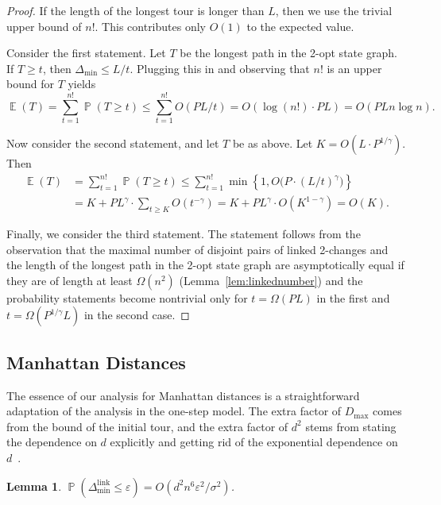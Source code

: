 \documentclass[11pt,DIV=12,a4paper]{scrartcl}
\newtheorem{lemma}[claim]{Lemma}
\newcommand{\eps}{\varepsilon}
\newcommand{\maxx}{D_{\max}}
\newcommand{\dmin}{\Delta_{\min}}
\newcommand{\dminl}{\Delta_{\min}^{\operatorname{link}}}
\DeclareMathOperator{\probab}{\mathbb{P}}
\DeclareMathOperator{\expected}{\mathbb{E}}
\begin{document}
\begin{proof}
If the length of the longest tour is longer than $L$, then we use the trivial
upper bound of $n!$. This contributes only $O(1)$ to the expected value.

Consider the first statement.
Let $T$ be the longest path in the 2-opt state graph. If $T \geq t$,
then $\dmin \leq L/t$.
Plugging this in and observing that $n!$ is an upper bound for $T$ yields
\[
  \expected(T)  = \sum_{t=1}^{n!} \probab(T\geq t) 
 \leq \sum_{t=1}^{n!} O(PL/t) = O(\log(n!) \cdot PL) = O(PLn \log n).
\]

Now consider the second statement, and let $T$ be as above.
Let $K = O(L \cdot P^{1/\gamma})$.
Then
\begin{align*}
  \expected(T) & = \sum_{t=1}^{n!} \probab(T \geq t) 
  \leq \sum_{t=1}^{n!} \min\left\{1, O\bigl(P \cdot (L/t)^\gamma\bigr)\right\} \\
& = K + PL^{\gamma} \cdot \sum_{t \geq K} O(t^{-\gamma})
 = K + PL^{\gamma} \cdot O(K^{1-\gamma}) = O(K).
\end{align*}

Finally, we consider the third statement.
The statement follows from the observation that
the maximal number of disjoint pairs of linked 2-changes and the length of the longest
path in the 2-opt state graph are asymptotically equal if they are of length at least $\Omega(n^2)$ (Lemma~\ref{lem:linkednumber}) and the probability statements become nontrivial
only for $t = \Omega(PL)$ in the first
and $t = \Omega(P^{1/\gamma}L)$ in the second case.
\end{proof}




\subsection{Manhattan Distances}
\label{sec:manhattan}

The essence of our analysis for Manhattan distances is a straightforward adaptation
of the analysis in the one-step model.
The extra factor of $\maxx$ comes from the bound of the initial tour, and the extra factor
of $d^2$ stems from stating the dependence on $d$ explicitly and getting rid of the exponential dependence on $d$~\cite[Proofs of Theorem~7 and Lemma~10]{EnglertEA:2Opt:2014}.

\begin{lemma}
\label{lem:manhattandminl}
$\probab(\dminl \leq \eps) = O(d^2n^6\eps^2/\sigma^2)$.
\end{lemma}
\end{document}
